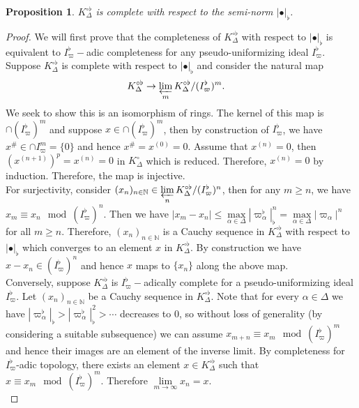 \documentclass[12pts,a4paper]{amsart}
\newtheorem{proposition}{Proposition}[section]
\begin{document}
\begin{proposition}
	$K^{\circ\flat}_\Delta$ is complete with respect to the semi-norm $|\bullet|_\flat$.
\end{proposition}

\begin{proof}
	We will first prove that the completeness of $K^{\circ\flat}_\Delta$ with respect to $|\bullet|_\flat$ is equivalent to $I^\flat_\varpi-$adic completeness for any pseudo-uniformizing ideal $I^\flat_\varpi$. Suppose $K^{\circ\flat}_\Delta$ is complete with respect to $|\bullet|_\flat$ and consider the natural map
    \begin{align*}
      K^{\circ\flat}_\Delta&\to \varprojlim\limits_m K^{\circ\flat}_\Delta/(I^\flat_\varpi)^m.
    \end{align*}
    We seek to show this is an isomorphism of rings. The kernel of this map is $\cap(I^\flat_\varpi)^m$ and suppose $x\in \cap (I^\flat_\varpi)^m$, then by construction of $I^\flat_\varpi$, we have $x^\#\in\cap I^m_\varpi=\{0\}$ and hence $x^\#=x^{(0)}=0$. Assume that $x^{(n)}=0$, then $(x^{(n+1)})^p=x^{(n)}=0$ in $K^\circ_\Delta$ which is reduced. Therefore, $x^{(n)}=0$ by induction. Therefore, the map is injective.\\
    
    For surjectivity, consider $(x_n)_{n\in\mathbb{N}}\in \varprojlim\limits_n K^{\circ\flat}_\Delta/(I^\flat_\varpi)^n$, then for any $m\geq n$, we have $x_m\equiv x_n\mod(I^\flat_\varpi)^n$. Then we have $|x_m-x_n|\leq \max\limits_{\alpha\in\Delta}|\varpi^\flat_\alpha|^n_\flat=\max\limits_{\alpha\in\Delta}|\varpi_\alpha|^n$ for all $m\geq n$. Therefore, $(x_n)_{n\in\mathbb{N}}$ is a Cauchy sequence in $K^{\circ\flat}_\Delta$ with respect to $|\bullet|_\flat$ which converges to an element $x$ in $K^{\circ\flat}_\Delta$. By construction we have $x-x_n\in (I^\flat_\varpi)^n$ and hence $x$ maps to $\{x_n\}$ along the above map.\\
    
    Conversely, suppose $K^{\circ\flat}_\Delta$ is $I^\flat_\varpi-$adically complete for a pseudo-uniformizing ideal $I^\flat_\varpi$. Let $(x_n)_{n\in\mathbb{N}}$ be a Cauchy sequence in $K^{\circ\flat}_\Delta$. Note that for every $\alpha\in\Delta$ we have $|\varpi^\flat_\alpha|_\flat>|\varpi^\flat_\alpha|_\flat^2>\cdots$ decreases to $0$, so without loss of generality (by considering a suitable subsequence) we can assume $x_{m+n}\equiv x_m\mod (I^\flat_\varpi)^m$ and hence their images are an element of the inverse limit. By completeness for $I^\flat_\varpi$-adic topology, there exists an element $x\in K^{\circ\flat}_\Delta$ such that $x\equiv x_m\mod(I^\flat_\varpi)^m$. Therefore $\lim\limits_{m\to\infty}x_n=x$.\\
	

\end{proof}
\end{document}

